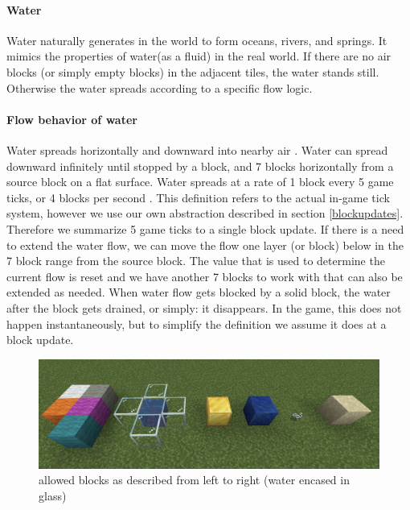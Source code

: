 \pagebreak
\paragraph{Water}
Water naturally generates in the world to form oceans, rivers, and springs\cite{minecraftfandom:water}. 
It mimics the properties of water(as a fluid) in the real world.
If there are no air blocks (or simply empty blocks) in the adjacent tiles,
the water stands still. Otherwise the water spreads according to a specific flow logic.

\paragraph{Flow behavior of water}
Water spreads horizontally and downward into nearby air . Water can spread downward infinitely until stopped by a block, and 7 blocks horizontally from a source block on a flat surface. \newline Water spreads at a rate of 1 block every 5 game ticks, or 4 blocks per second \cite{minecraftfandom:waterspread}.\newline
\newline This definition refers to the actual in-game tick system, however we use our own abstraction described in section \ref{blockupdates}.
Therefore we summarize 5 game ticks to a single block update.
\newline If there is a need to extend the water flow, we can move the flow one layer (or block) below in the 7 block range from the source block.
The value that is used to determine the current flow is reset and we have another 7 blocks to work with that can also be extended as needed.
\newline When water flow gets blocked by a solid block, the water after the block gets drained, or simply: it disappears. In the game, this does not happen instantaneously, but to simplify the definition we assume it does at a block update.

\begin{figure}[h]
    \centering
    \includegraphics[width=\linewidth]{images/allowed blocks.png}
    \caption{allowed blocks as described from left to right (water encased in glass)}
    \label{fig:allowedblocks}
\end{figure}

